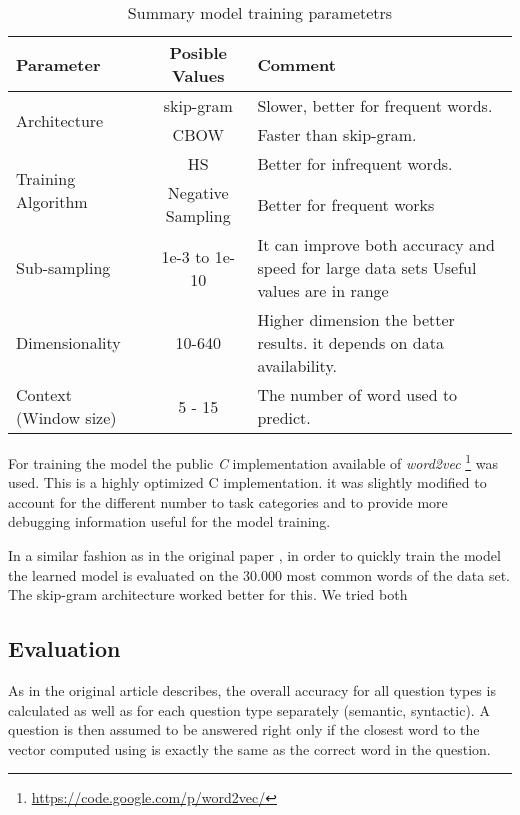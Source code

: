 \begin{table}[h]
   \centering
   \caption{Summary model training parametetrs} 
   \label{tab:word2_vec_parameters}
   
   \small
   \begin{tabular}{ |l|c|p{5cm}| }
   \hline           
    Parameter &  Posible Values & Comment \\  \hline           
    \multirow{2}{*}{Architecture}  & skip-gram  & Slower, better for frequent
    words. \\ 
    \cline{2-3}
    & \ac{CBOW}  &  Faster than skip-gram. \\ \hline
    \multirow{2}{*}{Training Algorithm}  & \ac{HS}  & Better for infrequent words.   \\ 
    \cline{2-3}
    & Negative Sampling & Better for frequent works \\ \hline
    Sub-sampling  & 1e-3 to 1e-10  &  It  can improve both accuracy and speed for large data
    sets Useful values are in range \\ \hline
    Dimensionality  & 10-640 & Higher dimension the better results. 
    it depends on data availability.  \\ \hline
    Context (Window size)  & 5 - 15 & The number of word used to predict. \\ \hline

    
\end{tabular}
\end{table}

For training  the model the public \emph{C} implementation available of
\textit{word2vec} \footnote{\url{https://code.google.com/p/word2vec/}} was
used.  This is a highly optimized C implementation. it was slightly modified to account for the different
number to task categories and to provide more debugging information useful
for the model training. 

In a similar fashion as in the original paper
\cite{DBLP:journals/corr/abs-1301-3781},  in order to quickly train the model
the  learned model is evaluated on  the 30.000 most common words of the
data set. The skip-gram architecture worked better for this.  We tried both 

\subsection{Evaluation}
\label{experiments:sub:evaluation}

As in the original article describes, the overall accuracy for all question
types is calculated as well as  for each question type separately (semantic,
syntactic). A question is then assumed to be answered right  only if the
closest word to the vector computed using  is exactly the same as the correct word in the
question. 
 

